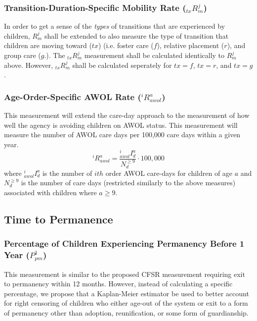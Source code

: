 \documentclass[12pt]{article}\usepackage[]{graphicx}\usepackage[]{color}
\begin{document}
\subsubsection{Transition-Duration-Specific Mobility Rate (${}_{tx}R_m^j$)}
In order to get a sense of the \emph{types} of transitions that are experienced by children, $R_m^j$ shall be extended to also measure the type of transition that children are moving toward ($tx$) (i.e. foster care ($f$), relative placement ($r$), and group care ($g$.). The ${}_{tx}R_m^j$ measurement shall be calculated identically to $R_m^j$ above. However, ${}_{tx}R_m^j$ shall be calculated seperately for $tx=f$, $tx=r$, and $tx=g$. 

\subsubsection{Age-Order-Specific AWOL Rate (${}^iR_{awol}^a$)}
This measurement will extend the care-day approach to the measurement of how well the agency is avoiding children on AWOL status. This measurement will measure the number of AWOL care days per 100,000 care days within a given year.  
\begin{equation}\label{eq:Rmj}
{}^iR_{awol}^a = \frac{{}_{awol}^iI_{d}^a}{N_d^{\geq9}} \cdot 100,000
\end{equation}
where ${}_{awol}^iI_{d}^a$ is the number of $ith$ order AWOL care-days for children of age $a$ and $N_d^{\geq9}$ is the number of care days (restricted similarly to the above measures) associated with children where $a\geq9$. 

\subsection{Time to Permanence}

\subsubsection{Percentage of Children Experiencing Permanency Before 1 Year ($P_{pm}^1$)}

This measurement is similar to the proposed CFSR measurement requiring exit to permanency within 12 months. However, instead of calculating a specific percentage, we propose that a Kaplan-Meier estimator be used to better account for right censoring of children who either age-out of the system or exit to a form of permanency other than adoption, reunification, or some form of guardianship. 
 
\end{document}
